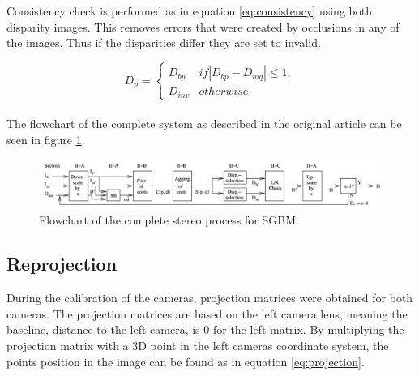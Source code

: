 Consistency check is performed as in equation \ref{eq:consistency} using both disparity images. This removes errors that were created by occlusions in any of the images. Thus if the disparities differ they are set to invalid. 


\begin{equation} \label{eq:consistency}
D_{p} =
\left\{\begin{matrix}
D_{bp}	&  if|D_{bp} - D_{mq}| \leq 1, \\
D_{inv} & otherwise
\end{matrix}\right.
\end{equation}\\ 


The flowchart of the complete system as described in the original article \cite{Hirschmuller2008} can be seen in figure \ref{fig:complete_system}.


\begin{figure}[h!]
  \centering
    \includegraphics[width=\textwidth]{graphics/06_vision/complete_system.jpg}
     \caption{ Flowchart of the complete stereo process for SGBM. } 
    \label{fig:complete_system}
\end{figure}


\subsection{Reprojection} \label{sec:reprojection}

During the calibration of the cameras, projection matrices were obtained for both cameras. The projection matrices are based on the left camera lens, meaning the baseline, distance to the left camera, is 0 for the left matrix. By multiplying the projection matrix with a 3D point in the left cameras coordinate system, the points position in the image can be found as in equation \ref{eq:projection}. 


